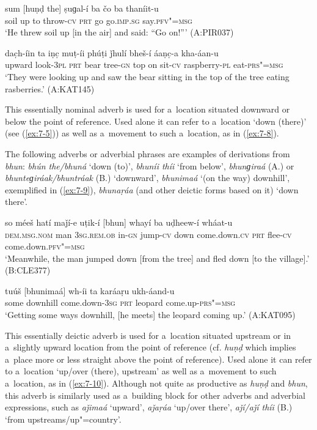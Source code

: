 \begin{exe}
\ex
\label{ex:7-6}
\gll sum [huṇḍ the] ṣuɡal-í ba čo ba  thaníit-u \\
soil up to throw-\textsc{cv} \textsc{prt} go go.\textsc{imp.sg} say.\textsc{pfv"=msg} \\
\glt `He threw soil up [in the air] and said: ``Go on!''' (A:PIR037)

\ex
\label{ex:7-7}
\gll [huṇḍɡiraá] dac̣h-íin ta iṇc̣ muṭ-íi phúṭi ǰhulí bheš-í áaṇc̣-a kha-áan-u \\
upward  look-\textsc{3pl} \textsc{prt} bear tree-\textsc{gn} top on sit-\textsc{cv} raspberry-\textsc{pl} eat-\textsc{prs"=msg} \\
\glt `They were looking up and saw the bear sitting in the top of the tree eating rasberries.' (A:KAT145)
\end{exe}

 This essentially nominal adverb is used for a~location situated downward or below the point of reference. Used alone it can refer to a~location `down (there)' (see (\ref{ex:7-5})) as well as a~movement to such a~location, as in (\ref{ex:7-8}).


The following adverbs or adverbial phrases are examples of derivations from \textit{bhun}: \textit{bhún the/bhuná} `down (to)', \textit{bhuníi thíi} `from below', \textit{bhunɡiraá} (A.) or \textit{bhunteɡiráak/bhuntráak} (B.) `downward', \textit{bhunimaá} `(on the way) downhill', exemplified in (\ref{ex:7-9}), \textit{bhunaṛáa} (and other deictic forms based on it) `down there'.

\begin{exe}
\ex
\label{ex:7-8}
\gll so méeš hatí maǰí-e uṭik-í [bhun]  whayí ba uḍheew-í wháat-u\\
\textsc{dem.msg.nom} man \textsc{3sg.rem.ob} in-\textsc{gn} jump-\textsc{cv} down
come.down.\textsc{cv} \textsc{prt} flee-\textsc{cv} come.down.\textsc{pfv"=msg} \\
\glt `Meanwhile, the man jumped down [from the tree] and fled down [to the village].' (B:CLE377)

\ex
\label{ex:7-9}
\gll tuúš [bhunimaá] wh-íi ta karáaṛu  ukh-áand-u \\
some downhill  come.down-\textsc{3sg} \textsc{prt} leopard come.up-\textsc{prs"=msg} \\
\glt `Getting some ways downhill, [he meets] the leopard coming up.' (A:KAT095)
\end{exe}

 This essentially deictic adverb is used for a~location situated upstream or in a~slightly upward location from the point of reference (cf. \textit{huṇḍ} which implies a~place more or less straight above the point of reference). Used alone it can refer to a~location `up/over (there), upstream' as well as a~movement to such a~location, as in (\ref{ex:7-10}). Although not quite as productive as \textit{huṇḍ} and \textit{bhun}, this adverb is similarly used as a~building block for other adverbs and adverbial expressions, such as \textit{aǰimaá} `upward', \textit{aǰaṛáa} `up/over there', \textit{aǰí/aǰí thíi} (B.) `from upstreams/up"=country'.

